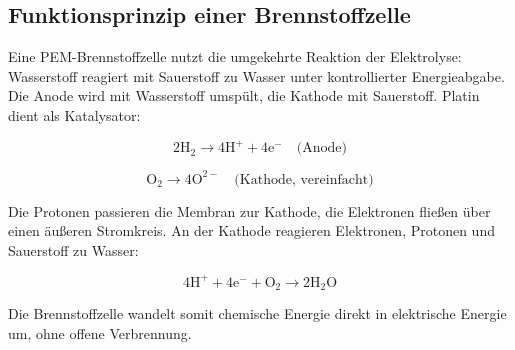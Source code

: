 \subsection{Funktionsprinzip einer Brennstoffzelle}

Eine PEM-Brennstoffzelle nutzt die umgekehrte Reaktion der Elektrolyse: Wasserstoff reagiert mit Sauerstoff zu Wasser unter kontrollierter Energieabgabe. Die Anode wird mit Wasserstoff umspült, die Kathode mit Sauerstoff. Platin dient als Katalysator:

\begin{equation}
2 \mathrm{H_2 \rightarrow 4 H^+ + 4 e^-} \quad \text{(Anode)}
\label{eq:h2_anode}
\end{equation}

\begin{equation}
\mathrm{O_2 \rightarrow 4 O^{2-}} \quad \text{(Kathode, vereinfacht)}
\label{eq:o2_kathode}
\end{equation}

Die Protonen passieren die Membran zur Kathode, die Elektronen fließen über einen äußeren Stromkreis. An der Kathode reagieren Elektronen, Protonen und Sauerstoff zu Wasser:

\begin{equation}
4 \mathrm{H^+ + 4 e^- + O_2 \rightarrow 2 H_2O}
\label{eq:h2o_kathode}
\end{equation}

Die Brennstoffzelle wandelt somit chemische Energie direkt in elektrische Energie um, ohne offene Verbrennung.

